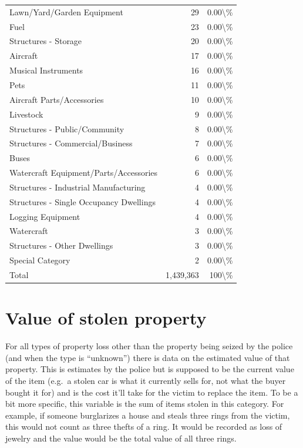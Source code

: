 \documentclass[
  12pt,
  openany]{book}
\begin{document}
\begin{longtable}[t]{lrr}
\addlinespace
Lawn/Yard/Garden Equipment & 29 & 0.00\textbackslash{}\%\\
Fuel & 23 & 0.00\textbackslash{}\%\\
Structures - Storage & 20 & 0.00\textbackslash{}\%\\
Aircraft & 17 & 0.00\textbackslash{}\%\\
Musical Instruments & 16 & 0.00\textbackslash{}\%\\
\addlinespace
Pets & 11 & 0.00\textbackslash{}\%\\
Aircraft Parts/Accessories & 10 & 0.00\textbackslash{}\%\\
Livestock & 9 & 0.00\textbackslash{}\%\\
Structures - Public/Community & 8 & 0.00\textbackslash{}\%\\
Structures - Commercial/Business & 7 & 0.00\textbackslash{}\%\\
\addlinespace
Buses & 6 & 0.00\textbackslash{}\%\\
Watercraft Equipment/Parts/Accessories & 6 & 0.00\textbackslash{}\%\\
Structures - Industrial Manufacturing & 4 & 0.00\textbackslash{}\%\\
Structures - Single Occupancy Dwellings & 4 & 0.00\textbackslash{}\%\\
Logging Equipment & 4 & 0.00\textbackslash{}\%\\
\addlinespace
Watercraft & 3 & 0.00\textbackslash{}\%\\
Structures - Other Dwellings & 3 & 0.00\textbackslash{}\%\\
Special Category & 2 & 0.00\textbackslash{}\%\\
Total & 1,439,363 & 100\textbackslash{}\%\\
\bottomrule
\end{longtable}

\section{Value of stolen property}\label{value-of-stolen-property}

For all types of property loss other than the property being seized by the police (and when the type is ``unknown'') there is data on the estimated value of that property. This is estimates by the police but is supposed to be the current value of the item (e.g.~a stolen car is what it currently sells for, not what the buyer bought it for) and is the cost it'll take for the victim to replace the item. To be a bit more specific, this variable is the sum of items stolen in this category. For example, if someone burglarizes a house and steals three rings from the victim, this would not count as three thefts of a ring. It would be recorded as loss of jewelry and the value would be the total value of all three rings.
\end{document}
